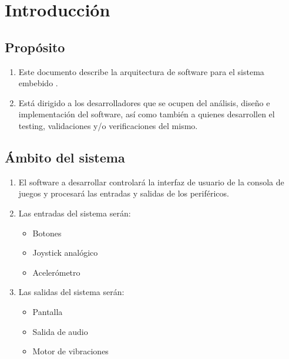 \documentclass[11pt,a4paper]{article}
\begin{document}
\pagebreak

\tableofcontents

\pagebreak
\section{Introducción}
\subsection{Propósito}
\begin{enumerate}
    \item Este documento describe la arquitectura de software para el sistema embebido \textit{\ttitle}. 
    \item Está dirigido a los desarrolladores que se ocupen del análisis, diseño e implementación del software, así como también a quienes desarrollen el testing, validaciones y/o verificaciones del mismo.
\end{enumerate}

\subsection{Ámbito del sistema}
\begin{enumerate}
  \item El software a desarrollar controlará la interfaz de usuario de la consola de juegos y procesará las entradas y salidas de los periféricos. 
  \item Las entradas del sistema serán:
  \begin{itemize}
    \item Botones
    \item Joystick analógico
    \item Acelerómetro
  \end{itemize}
  \item Las salidas del sistema serán:
  \begin{itemize}
    \item Pantalla
    \item Salida de audio
    \item Motor de vibraciones
  \end{itemize}
\end{enumerate}
\end{document}
